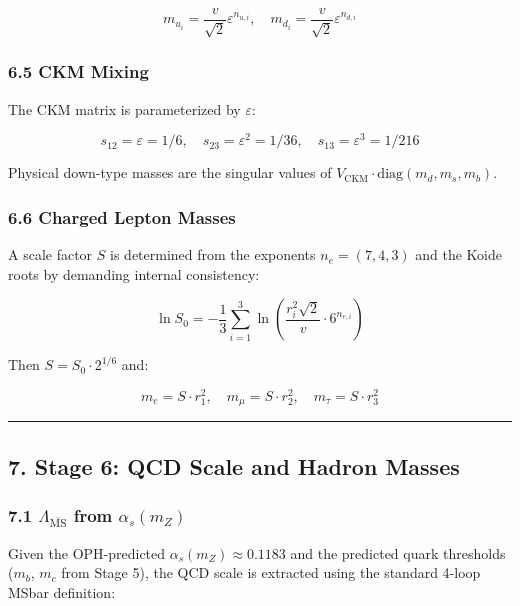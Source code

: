 \[m_{u_i} = \frac{v}{\sqrt{2}} \varepsilon^{n_{u,i}}, \quad m_{d_i} = \frac{v}{\sqrt{2}} \varepsilon^{n_{d,i}}\]

\subsubsection{6.5 CKM Mixing}\label{65-ckm-mixing}

The CKM matrix is parameterized by \(\varepsilon\):

\[s_{12} = \varepsilon = 1/6, \quad s_{23} = \varepsilon^2 = 1/36, \quad s_{13} = \varepsilon^3 = 1/216\]

Physical down-type masses are the singular values of \(V_{\text{CKM}} \cdot \text{diag}(m_d, m_s, m_b)\).

\subsubsection{6.6 Charged Lepton Masses}\label{66-charged-lepton-masses}

A scale factor \(S\) is determined from the exponents \(n_e = (7, 4, 3)\) and the Koide roots by demanding internal consistency:

\[\ln S_0 = -\frac{1}{3}\sum_{i=1}^3 \ln\left(\frac{r_i^2 \sqrt{2}}{v} \cdot 6^{n_{e,i}}\right)\]

Then \(S = S_0 \cdot 2^{1/6}\) and:

\[m_e = S \cdot r_1^2, \quad m_\mu = S \cdot r_2^2, \quad m_\tau = S \cdot r_3^2\]

\begin{center}\rule{0.5\linewidth}{0.5pt}\end{center}

\subsection{7. Stage 6: QCD Scale and Hadron Masses}\label{7-stage-6-qcd-scale-and-hadron-masses}

\subsubsection{\texorpdfstring{7.1 \(\Lambda_{\overline{\text{MS}}}\) from \(\alpha_s(m_Z)\)}{7.1 \textbackslash Lambda\_\{\textbackslash overline\{\textbackslash text\{MS\}\}\} from \textbackslash alpha\_s(m\_Z)}}\label{71-lambda_overlinetextms-from-alpha_sm_z}

Given the OPH-predicted \(\alpha_s(m_Z) \approx 0.1183\) and the predicted quark thresholds (\(m_b\), \(m_c\) from Stage 5), the QCD scale is extracted using the standard 4-loop MSbar definition:


